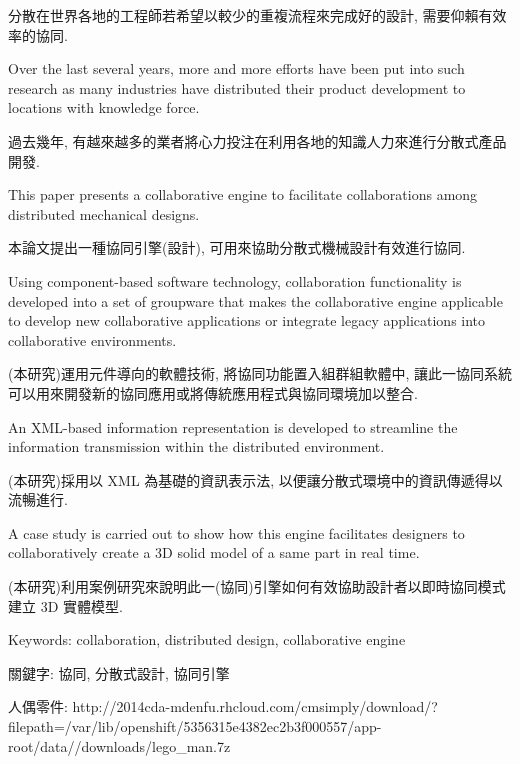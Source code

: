 \documentclass[]{article}
\begin{document}
分散在世界各地的工程師若希望以較少的重複流程來完成好的設計,
需要仰賴有效率的協同.

Over the last several years, more and more efforts have been put into
such research as many industries have distributed their product
development to locations with knowledge force.

過去幾年,
有越來越多的業者將心力投注在利用各地的知識人力來進行分散式產品開發.

This paper presents a collaborative engine to facilitate collaborations
among distributed mechanical designs.

本論文提出一種協同引擎(設計), 可用來協助分散式機械設計有效進行協同.

Using component-based software technology, collaboration functionality
is developed into a set of groupware that makes the collaborative engine
applicable to develop new collaborative applications or integrate legacy
applications into collaborative environments.

(本研究)運用元件導向的軟體技術, 將協同功能置入組群組軟體中,
讓此一協同系統可以用來開發新的協同應用或將傳統應用程式與協同環境加以整合.

An XML-based information representation is developed to streamline the
information transmission within the distributed environment.

(本研究)採用以 XML 為基礎的資訊表示法,
以便讓分散式環境中的資訊傳遞得以流暢進行.

A case study is carried out to show how this engine facilitates
designers to collaboratively create a 3D solid model of a same part in
real time.

(本研究)利用案例研究來說明此一(協同)引擎如何有效協助設計者以即時協同模式建立
3D 實體模型.

Keywords: collaboration, distributed design, collaborative engine

關鍵字: 協同, 分散式設計, 協同引擎

人偶零件:
http://2014cda-mdenfu.rhcloud.com/cmsimply/download/?filepath=/var/lib/openshift/5356315e4382ec2b3f000557/app-root/data//downloads/lego\_man.7z
\end{document}
